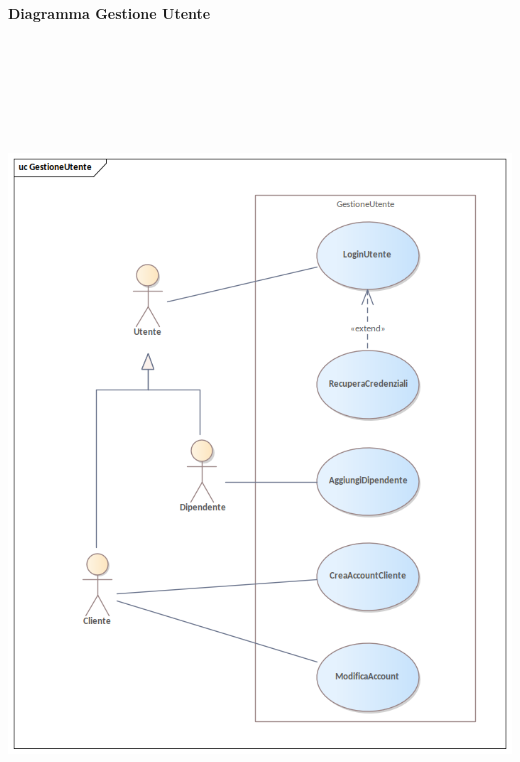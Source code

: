 \setcounter{IDCasiDuso}{1}
\paragraph{Diagramma Gestione Utente}\mbox{}\\
\begin{center}
  \includegraphics[width=\textwidth, height=20cm, keepaspectratio]{immagini/GestioneDeiRequisiti/GestioneUtente.png}
\end{center}

\newpage
